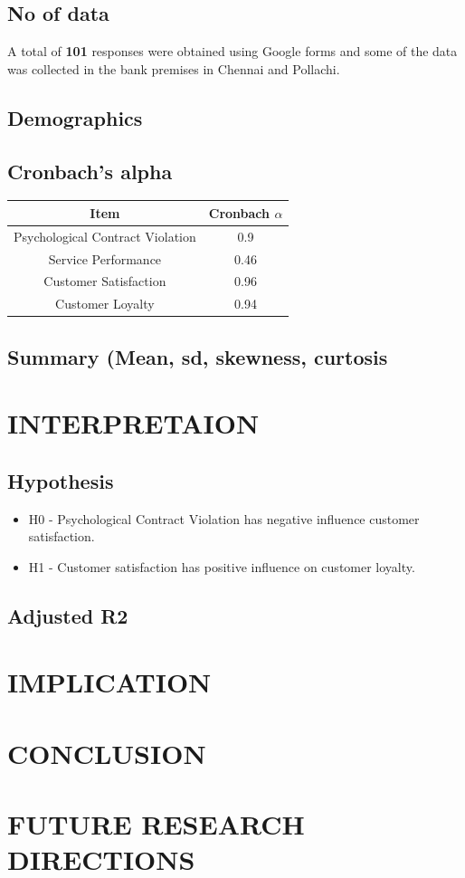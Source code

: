 \documentclass[a4paper, 14pt]{article}
\begin{document}
{\subsection*{No of data}
\par A total of \textbf{101} responses were obtained using Google forms and some of the data was collected in the bank premises in Chennai and Pollachi.
\subsection*{Demographics}
\subsection*{Cronbach's alpha}
\begin{center}
\begin{tabular}{|c|c|}
\hline
\textbf{Item} & \textbf{Cronbach $\alpha$}\\
\hline
Psychological Contract Violation & 0.9 \\
Service Performance & 0.46 \\
Customer Satisfaction & 0.96 \\
Customer Loyalty & 0.94 \\
\hline
\end{tabular}
\end{center}
\subsection*{Summary (Mean, sd, skewness, curtosis}
\section*{INTERPRETAION}
\subsection*{Hypothesis}
\begin{itemize}
\item H0 - Psychological Contract Violation has negative influence customer satisfaction.
\item H1 - Customer satisfaction has positive influence on customer loyalty.
\end{itemize}
\subsection*{Adjusted R2}
\section*{IMPLICATION}
\section*{CONCLUSION}
\section*{FUTURE RESEARCH DIRECTIONS}
}
\end{document}

